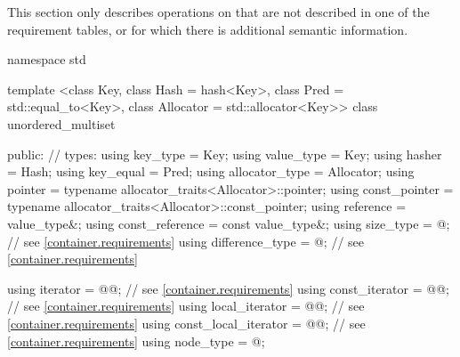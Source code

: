 \pnum
This section only describes operations on  that
are not described in one of the requirement tables, or for which there
is additional semantic information.

%
\begin{codeblock}
namespace std {
  template <class Key,
            class Hash = hash<Key>,
            class Pred = std::equal_to<Key>,
            class Allocator = std::allocator<Key>>
  class unordered_multiset {
  public:
    // types:
    using key_type             = Key;
    using value_type           = Key;
    using hasher               = Hash;
    using key_equal            = Pred;
    using allocator_type       = Allocator;
    using pointer              = typename allocator_traits<Allocator>::pointer;
    using const_pointer        = typename allocator_traits<Allocator>::const_pointer;
    using reference            = value_type&;
    using const_reference      = const value_type&;
    using size_type            = @\impdef@; // see \ref{container.requirements}
    using difference_type      = @\impdef@; // see \ref{container.requirements}

    using iterator             = @@; // see \ref{container.requirements}
    using const_iterator       = @@; // see \ref{container.requirements}
    using local_iterator       = @@; // see \ref{container.requirements}
    using const_local_iterator = @@; // see \ref{container.requirements}
    using node_type            = @\unspec@;

}}
\end{codeblock}
